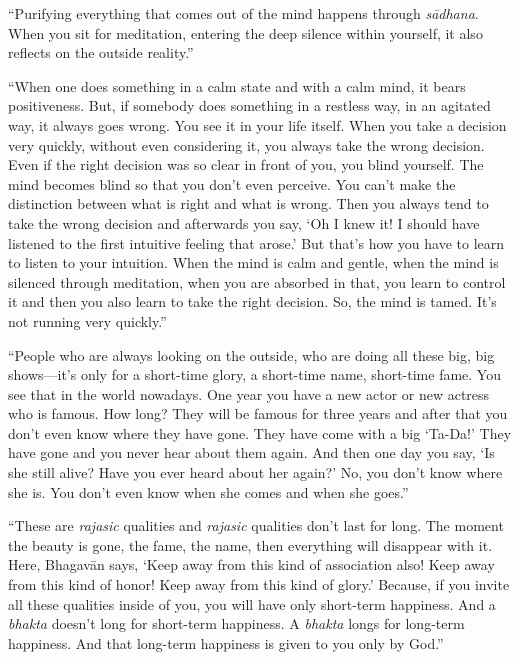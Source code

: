 \enquote{Purifying everything that comes out of the mind happens through \textit{sādhana}. When you sit for meditation, entering the deep silence within yourself, it also reflects on the outside reality.}

\enquote{When one does something in a calm state and with a calm mind, it bears positiveness. But, if somebody does something in a restless way, in an agitated way, it always goes wrong. You see it in your life itself. When you take a decision very quickly, without even considering it, you always take the wrong decision. Even if the right decision was so clear in front of you, you blind yourself. The mind becomes blind so that you don’t even perceive. You can’t make the distinction between what is right and what is wrong. Then you always tend to take the wrong decision and afterwards you say, \enquote{Oh I knew it! I should have listened to the first intuitive feeling that arose.} But that’s how you have to learn to listen to your intuition. When the mind is calm and gentle, when the mind is silenced through meditation, when you are absorbed in that, you learn to control it and then you also learn to take the right decision. So, the mind is tamed. It’s not running very quickly.}

\enquote{People who are always looking on the outside, who are doing all these big, big shows---it’s only for a short-time glory, a short-time name, short-time fame. You see that in the world nowadays. One year you have a new actor or new actress who is famous. How long? They will be famous for three years and after that you don’t even know where they have gone. They have come with a big \enquote{Ta-Da!} They have gone and you never hear about them again. And then one day you say, \enquote{Is she still alive? Have you ever heard about her again?} No, you don’t know where she is. You don’t even know when she comes and when she goes.}

\enquote{These are \textit{rajasic} qualities and \textit{rajasic} qualities don’t last for long. The moment the beauty is gone, the fame, the name, then everything will disappear with it. Here, Bhagavān says, \enquote{Keep away from this kind of association also! Keep away from this kind of honor! Keep away from this kind of glory.} Because, if you invite all these qualities inside of you, you will have only short-term happiness. And a \textit{bhakta} doesn’t long for short-term happiness. A \textit{bhakta} longs for long-term happiness. And that long-term happiness is given to you only by God.}

